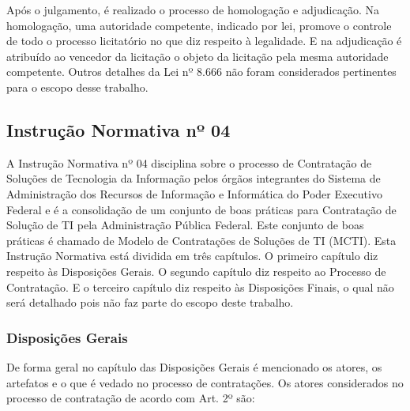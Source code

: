 Após o julgamento, é realizado o processo de homologação e adjudicação. Na homologação, uma autoridade competente, indicado por lei, promove o controle de todo o processo licitatório no que diz respeito à legalidade. E na adjudicação é  atribuído ao vencedor da licitação o objeto da licitação pela mesma autoridade competente. Outros detalhes da Lei nº 8.666 não foram considerados pertinentes para o escopo desse trabalho.


\subsection[Instrução Normativa nº 04]{Instrução Normativa nº 04}

A Instrução Normativa nº 04 \cite{IN04:2010} disciplina sobre o processo de Contratação de Soluções de Tecnologia da Informação pelos órgãos integrantes do Sistema de Administração dos Recursos de Informação e Informática do Poder  Executivo Federal e é a consolidação de um conjunto de boas práticas para Contratação de Solução de TI pela Administração Pública Federal. Este conjunto de boas práticas é chamado de Modelo de Contratações de Soluções de TI (MCTI). Esta Instrução Normativa está dividida em três capítulos. O primeiro capítulo diz respeito às Disposições Gerais. O segundo capítulo diz respeito ao Processo de Contratação. E o terceiro capítulo diz respeito às Disposições Finais, o qual não será detalhado pois não faz parte do escopo deste trabalho.

\subsubsection[Disposições Gerais]{Disposições Gerais}

De forma geral no capítulo das Disposições Gerais é mencionado os atores, os artefatos e o que é vedado no processo de contratações.  Os atores considerados no processo de contratação de acordo com Art. 2º são: 

